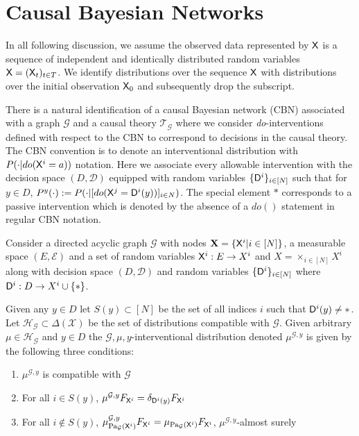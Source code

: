 \section{Causal Bayesian Networks}

In all following discussion, we assume the observed data represented by $\mathsf{X}$ is a sequence of independent and identically distributed random variables $\mathsf{X}=(\mathsf{X}_t)_{t\in T}$. We identify distributions over the sequence $\mathsf{X}$ with distributions over the initial observation $\mathsf{X}_0$ and subsequently drop the subscript.

There is a natural identification of a causal Bayesian network (CBN) associated with a graph $\mathcal{G}$ and a causal theory $\mathscr{T}_{\mathcal{G}}$ where we consider \emph{do}-interventions defined with respect to the CBN to correspond to decisions in the causal theory. The CBN convention is to denote an interventional distribution with $P(\cdot|do(\mathsf{X}^i=a))$ notation. Here we associate every allowable intervention with the decision space $(D,\mathcal{D})$ equipped with random variables $\{\mathsf{D}^i\}_{i\in[N]}$ such that for $y\in D$, $P^y(\cdot) := P(\cdot|[do(\mathsf{X}^j=\mathsf{D}^i(y))]_{i\in N})$. The special element $*$ corresponds to a passive intervention which is denoted by the absence of a $do()$ statement in regular CBN notation.

\begin{definition}\label{def:CBN}
Consider a directed acyclic graph $\mathcal{G}$ with nodes $\mathbf{X}=\{\mathsf{X}^i|i\in [N]\}$, a measurable space $(E,\mathcal{E})$ and a set of random variables $\mathsf{X}^i:E\to X^i$ and $X=\times_{i\in[N]} X^i$ along with decision space $(D,\mathcal{D})$ and random variables $\{\mathsf{D}^i\}_{i\in [N]}$ where $\mathsf{D}^i:D\to X^i\cup\{*\}$.

Given any $y\in D$ let $S(y)\subset[N]$ be the set of all indices $i$ such that $\mathsf{D}^i(y)\neq *$. Let $\mathscr{H}_\mathcal{G}\subset\Delta(\mathcal{X})$ be the set of distributions compatible with $\mathcal{G}$. Given arbitrary $\mu\in \mathscr{H}_\mathcal{G}$ and $y\in D$ the $\mathcal{G},\mu,y$-interventional distribution denoted $\mu^{\mathcal{G},y}$ is given by the following three conditions:
\begin{enumerate}
    \item $\mu^{\mathcal{G},y}$ is compatible with $\mathcal{G}$
    \item For all $i\in S(y)$, $\mu^{\mathcal{G},y}F_{\mathsf{X}^i}=\delta_{\mathsf{D}^i(y)} F_{\mathsf{X}^i}$
    \item For all $i\not \in S(y)$, $\mu^{\mathcal{G},y}_{\text{Pa}_{\mathcal{G}}(\mathsf{X}^i)} F_{\mathsf{X}^i}=\mu_{\text{Pa}_{\mathcal{G}}(\mathsf{X}^i)}F_{\mathsf{X}^i} $, $\mu^{\mathcal{G},y}$-almost surely
\end{enumerate}
\end{definition}

